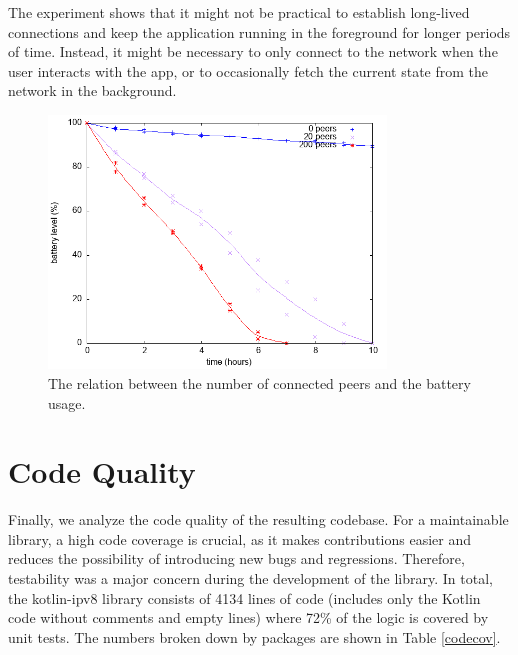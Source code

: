 The experiment shows that it might not be practical to establish long-lived connections and keep the application running in the foreground for longer periods of time. Instead, it might be necessary to only connect to the network when the user interacts with the app, or to occasionally fetch the current state from the network in the background.

\begin{figure}[h!]
    \centering
    \includegraphics[width=0.8\textwidth]{plots/battery}
    \caption{The relation between the number of connected peers and the battery usage.}
    \label{battery}
\end{figure}

\section{Code Quality}

Finally, we analyze the code quality of the resulting codebase. For a maintainable library, a high code coverage is crucial, as it makes contributions easier and reduces the possibility of introducing new bugs and regressions. Therefore, testability was a major concern during the development of the library. In total, the kotlin-ipv8 library consists of 4134 lines of code (includes only the Kotlin code without comments and empty lines) where 72\% of the logic is covered by unit tests. The numbers broken down by packages are shown in Table \ref{codecov}.

